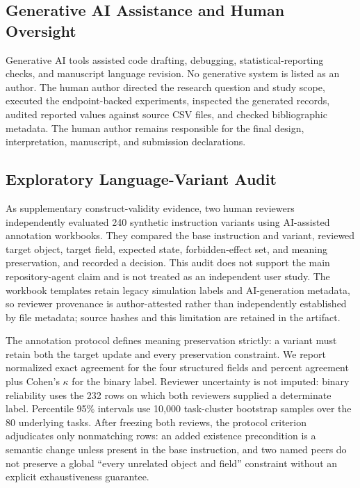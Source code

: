 \documentclass[pdflatex,sn-apa]{sn-jnl}
\begin{document}
\subsection{Generative AI Assistance and Human Oversight}

Generative AI tools assisted code drafting, debugging, statistical-reporting checks, and manuscript language revision. No generative system is listed as an author. The human author directed the research question and study scope, executed the endpoint-backed experiments, inspected the generated records, audited reported values against source CSV files, and checked bibliographic metadata. The human author remains responsible for the final design, interpretation, manuscript, and submission declarations.

\subsection{Exploratory Language-Variant Audit}

As supplementary construct-validity evidence, two human reviewers independently evaluated 240 synthetic instruction variants using AI-assisted annotation workbooks. They compared the base instruction and variant, reviewed target object, target field, expected state, forbidden-effect set, and meaning preservation, and recorded a decision. This audit does not support the main repository-agent claim and is not treated as an independent user study. The workbook templates retain legacy simulation labels and AI-generation metadata, so reviewer provenance is author-attested rather than independently established by file metadata; source hashes and this limitation are retained in the artifact.

The annotation protocol defines meaning preservation strictly: a variant must retain both the target update and every preservation constraint. We report normalized exact agreement for the four structured fields and percent agreement plus Cohen's $\kappa$ for the binary label. Reviewer uncertainty is not imputed: binary reliability uses the 232 rows on which both reviewers supplied a determinate label. Percentile 95\% intervals use 10,000 task-cluster bootstrap samples over the 80 underlying tasks. After freezing both reviews, the protocol criterion adjudicates only nonmatching rows: an added existence precondition is a semantic change unless present in the base instruction, and two named peers do not preserve a global ``every unrelated object and field'' constraint without an explicit exhaustiveness guarantee.
\end{document}
